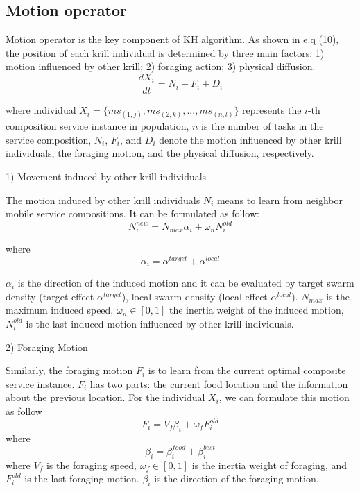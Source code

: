 \documentclass[10pt,journal,compsoc]{IEEEtran}
\begin{document}
\subsection{Motion operator}
% 
% 

Motion operator is the key component of KH algorithm. As shown in e.q (10), the position of each krill individual is determined by three main factors: 1) motion influenced by other krill; 2) foraging action; 3) physical diffusion. 
\begin{equation}
\frac{dX_i}{dt} =N_i+F_i+D_i
\end{equation}

where individual $X_i = \{ms_{(1,j)}, ms_{(2,k)}, . . . , ms_{(n,l)}\}$ represents the $i$-th composition service instance in population, $n$ is the number of tasks in the service composition, $N_i$, $F_i$, and $D_i$ denote the motion influenced by other krill individuals, the foraging motion, and the physical diffusion, respectively.

1) Movement induced by other krill individuals

The motion induced by other krill individuals $N_i$ means to learn from neighbor mobile service compositions. It can be formulated as follow:
\begin{equation}
N^{new}_i = N_{max}\alpha_i + \omega_n N^{old}_i
\end{equation}

where
\begin{equation}
\alpha_i = \alpha^{target} + \alpha^{local}
\end{equation}

$\alpha_i$ is the direction of the induced motion and it can be evaluated by target swarm density (target effect $\alpha^{target}$), local swarm density (local effect $\alpha^{local}$). $N_{max}$ is the maximum induced speed, $\omega_n \in [0, 1]$ the inertia weight of the induced motion, $N^{old}_{i}$ is the last induced motion influenced by other krill individuals.

2) Foraging Motion

Similarly, the foraging motion $F_i$ is to learn from the current optimal composite service instance. 
$F_i$ has two parts: the current food location and the information about the previous location. 
For the individual $X_i$, we can formulate this motion as follow
\begin{equation}
F_i = V_f\beta_i + \omega_f F^{old}_i
\end{equation}
where
\begin{equation}
\beta_i = \beta_i^{food}+\beta_i^{best}
\end{equation}
where $V_f$ is the foraging speed, $\omega_f \in [0, 1]$ is the inertia weight of foraging, and $F^{old}_i$ is the last foraging motion. $\beta_i$ is the direction of the foraging motion.
\end{document}
